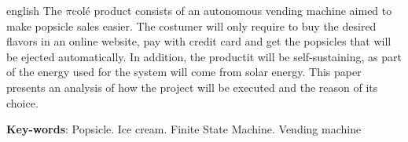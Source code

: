 \begin{resumo}[Abstract]
 \begin{otherlanguage*}{english}
The $\pi$colé product consists of an autonomous vending machine aimed to make popsicle sales easier. The costumer will only require to buy the desired flavors in an online website, pay with credit card and get the popsicles that will be ejected automatically. In addition, the productit will be self-sustaining, as part of the energy used for the system will come from solar energy. This paper presents an analysis of how the project will be executed and the reason of its choice.

   \vspace{\onelineskip}
 
   \noindent 
   \textbf{Key-words}: Popsicle. Ice cream. Finite State Machine. Vending machine
 \end{otherlanguage*}
\end{resumo}
